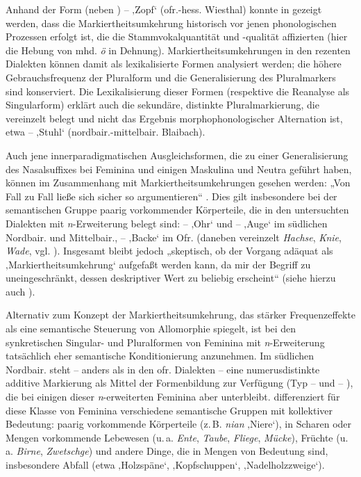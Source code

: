 Anhand der Form  (neben ) --    ‚Zopf‘ (ofr.-hess. Wiesthal) konnte in  gezeigt werden, dass die Markiertheitsumkehrung historisch vor jenen phonologischen Prozessen erfolgt ist, die die Stammvokalquantität und -qualität affizierten (hier die Hebung von mhd. \textit{ö} in Dehnung). Markiertheitsumkehrungen in den rezenten Dialekten können damit als lexikalisierte Formen analysiert werden; die höhere Gebrauchsfrequenz der Pluralform und die Generalisierung des Pluralmarkers sind konserviert. Die Lexikalisierung dieser Formen (respektive die Reanalyse als Singularform) erklärt auch die sekundäre, distinkte Pluralmarkierung, die vereinzelt belegt und nicht das Ergebnis morphophonologischer Alternation ist, etwa  --  ‚Stuhl‘ (nordbair.-mittelbair. Blaibach).

Auch jene innerparadigmatischen Ausgleichsformen, die zu einer Generalisierung des Nasalsuffixes bei Feminina und einigen Maskulina und Neutra geführt haben, können im Zusammenhang mit Markiertheitsumkehrungen gesehen werden: „Von Fall zu Fall ließe sich sicher so argumentieren“ \citep[159]{Rowley1997}. Dies gilt insbesondere bei der semantischen Gruppe paarig vorkommender Körperteile, die in den untersuchten Dialekten mit \textit{n}{}-Erweiterung belegt sind:  --  ‚Ohr‘ und  --  ‚Auge‘ im südlichen Nordbair. und Mittelbair.,  --  ‚Backe‘ im Ofr. (daneben vereinzelt \textit{Hachse}, \textit{Knie}, \textit{Wade}, vgl. ). Insgesamt bleibt \citet[189]{Rowley1997} jedoch „skeptisch, ob der Vorgang adäquat als ‚Markiertheitsumkehrung‘ aufgefaßt werden kann, da mir der Begriff zu uneingeschränkt, dessen deskriptiver Wert zu beliebig erscheint“ (siehe hierzu auch \citealt[144]{Bybee2010}).

Alternativ zum Konzept der Markiertheitsumkehrung, das stärker Frequenzeffekte als eine semantische Steuerung von Allomorphie spiegelt, ist bei den synkretischen Singular- und Pluralformen von Feminina mit \textit{n}{}-Erweiterung tatsächlich eher semantische Konditionierung anzunehmen. Im südlichen Nordbair. steht -- anders als in den ofr. Dialekten -- eine numerusdistinkte additive Markierung als Mittel der Formenbildung zur Verfügung (Typ  --  und  -- ), die bei einigen dieser \textit{n}{}-erweiterten Feminina aber unterbleibt. \citet[§140.6]{Kollmer1987} differenziert für diese Klasse von Feminina verschiedene semantische Gruppen mit kollektiver Bedeutung: paarig vorkommende Körperteile (z.\,B. \textit{nian} ‚Niere‘), in Scharen oder Mengen vorkommende Lebewesen (u.\,a. \textit{Ente}, \textit{Taube}, \textit{Fliege}, \textit{Mücke}), Früchte (u.\,a. \textit{Birne}, \textit{Zwetschge}) und andere Dinge, die in Mengen von Bedeutung sind, insbesondere Abfall (etwa  ‚Holzspäne‘,  ‚Kopfschuppen‘,  ‚Nadelholzzweige‘).

